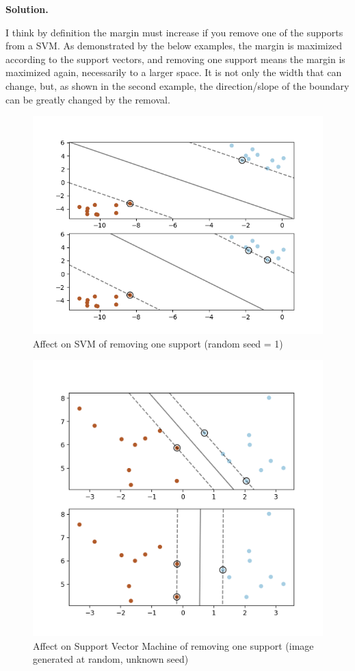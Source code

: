 \documentclass[10pt]{article}
\begin{document}
\begin{itemize}
{\bf Solution.}

I think by definition the margin must increase if you remove one of the supports from a SVM. As demonstrated by the below examples, the margin is maximized according to the support vectors, and removing one support means the margin is maximized again, necessarily to a larger space. It is not only the width that can change, but, as shown in the second example, the direction/slope of the boundary can be greatly changed by the removal.

\begin{figure}[H]
\centering
  \includegraphics{code/svm.png}
 \caption{Affect on SVM of removing one support (random seed = 1)}
\end{figure}

\begin{figure}[H]
\centering
  \includegraphics{code/svm2.png}
 \caption{Affect on Support Vector Machine of removing one support (image generated at random, unknown seed)}
\end{figure}


\end{itemize}
\end{document}

